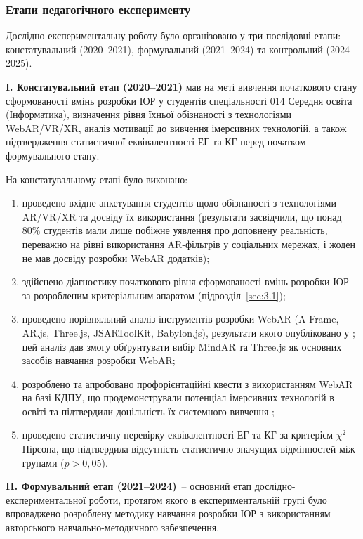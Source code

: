 \subsubsection{Етапи педагогічного експерименту}

Дослідно-експериментальну роботу було організовано у три послідовні етапи: констатувальний (2020--2021), формувальний (2021--2024) та контрольний (2024--2025).

\textbf{I. Констатувальний етап (2020--2021)} мав на меті вивчення початкового стану сформованості вмінь розробки ІОР у студентів спеціальності 014 Середня освіта (Інформатика), визначення рівня їхньої обізнаності з технологіями WebAR/VR/XR, аналіз мотивації до вивчення імерсивних технологій, а також підтвердження статистичної еквівалентності ЕГ та КГ перед початком формувального етапу.

На констатувальному етапі було виконано:
\begin{enumerate}
\item проведено вхідне анкетування студентів щодо обізнаності з технологіями AR/VR/XR та досвіду їх використання (результати засвідчили, що понад 80\% студентів мали лише побіжне уявлення про доповнену реальність, переважно на рівні використання AR-фільтрів у соціальних мережах, і жоден не мав досвіду розробки WebAR додатків);
\item здійснено діагностику початкового рівня сформованості вмінь розробки ІОР за розробленим критеріальним апаратом (підрозділ~\ref{sec:3.1});
\item проведено порівняльний аналіз інструментів розробки WebAR (A-Frame, AR.js, Three.js, JSARToolKit, Babylon.js), результати якого опубліковано у \cite{Shepiliev2020WebAR}; цей аналіз дав змогу обґрунтувати вибір MindAR та Three.js як основних засобів навчання розробки WebAR;
\item розроблено та апробовано профорієнтаційні квести з використанням WebAR на базі КДПУ, що продемонстрували потенціал імерсивних технологій в освіті та підтвердили доцільність їх системного вивчення \cite{Shepiliev2021Career};
\item проведено статистичну перевірку еквівалентності ЕГ та КГ за критерієм $\chi^2$ Пірсона, що підтвердила відсутність статистично значущих відмінностей між групами ($p > 0{,}05$).
\end{enumerate}

\textbf{II. Формувальний етап (2021--2024)}~-- основний етап дослідно-експериментальної роботи, протягом якого в експериментальній групі було впроваджено розроблену методику навчання розробки ІОР з використанням авторського навчально-методичного забезпечення.

